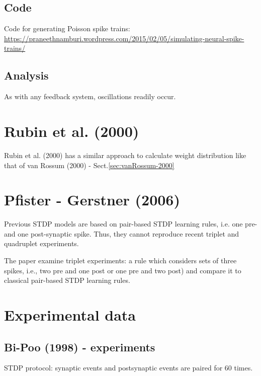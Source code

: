 \subsection{Code}

Code for generating Poisson spike trains:
\url{https://praneethnamburi.wordpress.com/2015/02/05/simulating-neural-spike-trains/}


\subsection{Analysis}

As with any feedback system, oscillations readily occur.

\section{Rubin et al. (2000)}

Rubin et al. (2000) has a similar approach to calculate weight distribution like
that of van Rossum (2000) - Sect.\ref{sec:vanRossum-2000}

\section{Pfister - Gerstner (2006)}

Previous STDP models are based on pair-based STDP learning rules, i.e. one
pre- and one post-synaptic spike. Thus, they cannot reproduce recent triplet and
quadruplet experiments.

The paper examine triplet experiments: a rule which considers sets of three
spikes, i.e., two pre and one post or one pre and two post) and compare it to
classical pair-based STDP learning rules.

 

\section{Experimental data}

\subsection{Bi-Poo (1998) - experiments}
\label{sec:Bi-Poo_1998}


STDP protocol: synaptic events and postsynaptic events are paired for 60 times.
